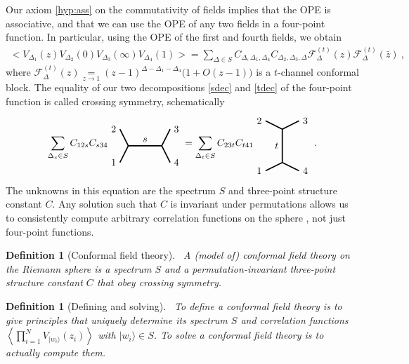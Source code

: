 \documentclass[12pt, a4paper]{article}
\theoremstyle{break}
\newtheorem{defn}[exo]{Definition}
\begin{document}
Our axiom \ref{hyp:ass} on the commutativity of fields implies that the OPE is associative, and that we can use the OPE of any two fields in a four-point function. In particular, using the OPE of the first and fourth fields, we obtain 
\begin{align}
 \Big<V_{\Delta_1}(z)V_{\Delta_2}(0)V_{\Delta_3}(\infty)V_{\Delta_4}(1)\Big>
 =\sum_{\Delta\in S} C_{\Delta,\Delta_1,\Delta_4} C_{\Delta_2,\Delta_3,\Delta}   \mathcal{F}^{(t)}_\Delta(z) \mathcal{F}^{(t)}_\Delta(\bar z)\ ,
 \label{tdec}
\end{align}
where $\mathcal{F}^{(t)}_\Delta(z) \underset{z\to 1}{=} (z-1)^{\Delta-\Delta_1-\Delta_4}\Big(1+O(z-1)\Big)$ is a $t$-channel conformal block.
The equality of our two decompositions \eqref{sdec} and \eqref{tdec} of the four-point function is called crossing symmetry, schematically 
\begin{align}
 \sum_{\Delta_s\in S} C_{12s} C_{s34} 
 \begin{tikzpicture}[baseline=(current  bounding  box.center), very thick, scale = .3]
\draw (-1,2) node [left] {$2$} -- (0,0) -- node [above] {$s$} (4,0) -- (5,2) node [right] {$3$};
\draw (-1,-2) node [left] {$1$} -- (0,0);
\draw (4,0) -- (5,-2) node [right] {$4$};
\end{tikzpicture} 
= \sum_{\Delta_t\in S} C_{23t}C_{t41} 
\begin{tikzpicture}[baseline=(current  bounding  box.center), very thick, scale = .3]
 \draw (-2,3) node [left] {$2$} -- (0,2) -- node [left] {$t$} (0,-2) -- (-2, -3) node [left] {$1$};
\draw (0,2) -- (2,3) node [right] {$3$};
\draw (0,-2) -- (2, -3) node [right] {$4$};
\end{tikzpicture}
\ .
\label{csd}
\end{align}
The unknowns in this equation are the spectrum $S$ and three-point structure constant $C$. 
Any solution such that $C$ is invariant under permutations allows us to consistently compute arbitrary correlation functions on the sphere \cite{ms89b}, not just four-point functions.

\begin{defn}[Conformal field theory]
~\label{def:cft}
A (model of) conformal field theory on the Riemann sphere is a spectrum $S$ and a permutation-invariant three-point structure constant $C$ that obey crossing symmetry.
\end{defn}

\begin{defn}[Defining and solving]
 ~\label{def:def}
 To define a conformal field theory is to give principles that uniquely determine its spectrum $S$ and correlation functions $\left<\prod_{i=1}^N V_{|w_i\rangle}(z_i)\right>$ with $|w_i\rangle\in S$.
 To solve a conformal field theory is to actually compute them.
\end{defn}
\end{document}
